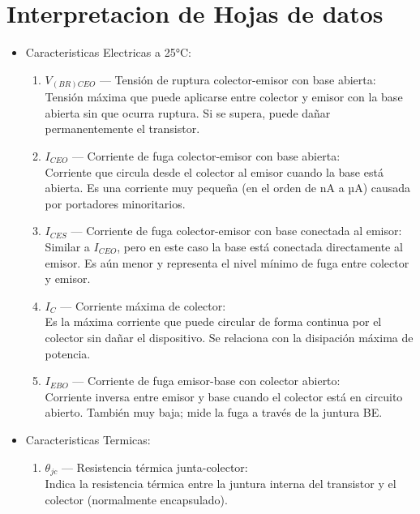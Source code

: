 \chapter{Interpretacion de Hojas de datos}

  \begin{itemize}
    \item Caracteristicas Electricas a 25°C:
      \begin{enumerate}
        \item \textbf{$V_{(BR)CEO}$} — Tensión de ruptura colector-emisor con base abierta: \\
        Tensión máxima que puede aplicarse entre colector y emisor con la base abierta sin que ocurra ruptura. Si se
              supera, puede dañar permanentemente el transistor.
        \item \textbf{$I_{CEO}$} — Corriente de fuga colector-emisor con base abierta: \\
        Corriente que circula desde el colector al emisor cuando la base está abierta. Es una corriente muy pequeña (en
              el orden de nA a µA) causada por portadores minoritarios.
        \item \textbf{$I_{CES}$} — Corriente de fuga colector-emisor con base conectada al emisor: \\
        Similar a $I_{CEO}$, pero en este caso la base está conectada directamente al emisor. Es aún menor y representa
              el nivel mínimo de fuga entre colector y emisor.
        \item \textbf{$I_C$} — Corriente máxima de colector: \\
        Es la máxima corriente que puede circular de forma continua por el colector sin dañar el dispositivo. Se
              relaciona con la disipación máxima de potencia.
        \item \textbf{$I_{EBO}$} — Corriente de fuga emisor-base con colector abierto: \\
        Corriente inversa entre emisor y base cuando el colector está en circuito abierto. También muy baja; mide la
              fuga a través de la juntura BE.      
      \end{enumerate}
    \item Caracteristicas Termicas:
      \begin{enumerate}
        \item \textbf{$\theta_{jc}$} — Resistencia térmica junta-colector: \\
        Indica la resistencia térmica entre la juntura interna del transistor y el colector (normalmente encapsulado).

\end{enumerate}
\end{itemize}
